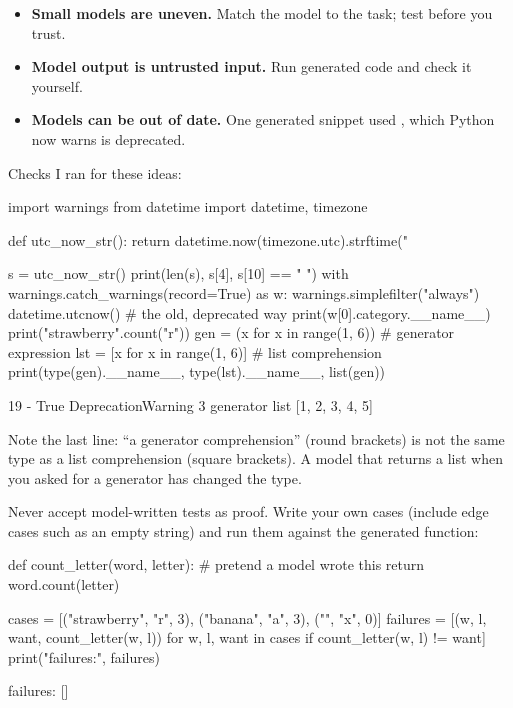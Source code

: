 \begin{itemize}[leftmargin=*]
\item \textbf{Small models are uneven.} Match the model to the task; test before you trust.
\item \textbf{Model output is untrusted input.} Run generated code and check it yourself.
\item \textbf{Models can be out of date.} One generated snippet used , which
Python now warns is deprecated.
\end{itemize}

Checks I ran for these ideas:

\begin{pycode}
import warnings
from datetime import datetime, timezone

def utc_now_str():
    return datetime.now(timezone.utc).strftime("%

s = utc_now_str()
print(len(s), s[4], s[10] == " ")
with warnings.catch_warnings(record=True) as w:
    warnings.simplefilter("always")
    datetime.utcnow()                       # the old, deprecated way
    print(w[0].category.__name__)
print("strawberry".count("r"))
gen = (x for x in range(1, 6))              # generator expression
lst = [x for x in range(1, 6)]              # list comprehension
print(type(gen).__name__, type(lst).__name__, list(gen))
\end{pycode}
\begin{rawcode}
19 - True
DeprecationWarning
3
generator list [1, 2, 3, 4, 5]
\end{rawcode}

Note the last line: ``a generator comprehension'' (round brackets) is not the same type as a list
comprehension (square brackets). A model that returns a list when you asked for a generator has
changed the type.

\begin{gamerule}
Never accept model-written tests as proof. Write your own cases (include edge cases such as an empty
string) and run them against the generated function:
\end{gamerule}

\begin{pycode}
def count_letter(word, letter):          # pretend a model wrote this
    return word.count(letter)

cases = [("strawberry", "r", 3), ("banana", "a", 3), ("", "x", 0)]
failures = [(w, l, want, count_letter(w, l))
            for w, l, want in cases if count_letter(w, l) != want]
print("failures:", failures)
\end{pycode}
\begin{rawcode}
failures: []
\end{rawcode}

